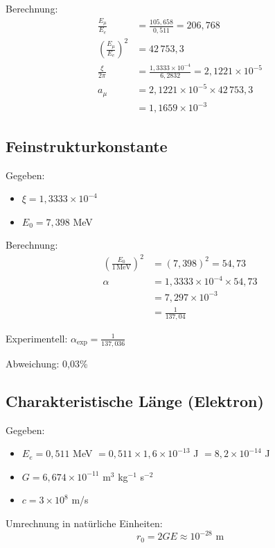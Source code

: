 	Berechnung:
	\begin{align}
		\frac{E_\mu}{E_e} &= \frac{105{,}658}{0{,}511} = 206{,}768 \\
		\left(\frac{E_\mu}{E_e}\right)^2 &= 42\,753{,}3 \\
		\frac{\xi}{2\pi} &= \frac{1{,}3333 \times 10^{-4}}{6{,}2832} = 2{,}1221 \times 10^{-5} \\
		a_\mu &= 2{,}1221 \times 10^{-5} \times 42\,753{,}3 \\
		&= 1{,}1659 \times 10^{-3}
	\end{align}
	
	\subsection{Feinstrukturkonstante}
	
	Gegeben:
	\begin{itemize}
		\item $\xi = 1{,}3333 \times 10^{-4}$
		\item $E_0 = 7{,}398$ MeV
	\end{itemize}
	
	Berechnung:
	\begin{align}
		\left(\frac{E_0}{1\,\text{MeV}}\right)^2 &= (7{,}398)^2 = 54{,}73 \\
		\alpha &= 1{,}3333 \times 10^{-4} \times 54{,}73 \\
		&= 7{,}297 \times 10^{-3} \\
		&= \frac{1}{137{,}04}
	\end{align}
	
	Experimentell: $\alpha_{\text{exp}} = \frac{1}{137{,}036}$
	
	Abweichung: 0,03\%
	
	\subsection{Charakteristische Länge (Elektron)}
	
	Gegeben:
	\begin{itemize}
		\item $E_e = 0{,}511$ MeV $= 0{,}511 \times 1{,}6 \times 10^{-13}$ J $= 8{,}2 \times 10^{-14}$ J
		\item $G = 6{,}674 \times 10^{-11}$ m$^3$ kg$^{-1}$ s$^{-2}$
		\item $c = 3 \times 10^8$ m/s
	\end{itemize}
	
	Umrechnung in natürliche Einheiten:
	\begin{equation}
		r_0 = 2GE \approx 10^{-28} \text{ m}
	\end{equation}
	

